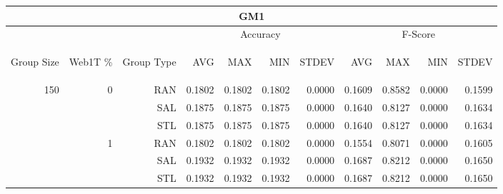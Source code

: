 \begin{center}
\begin{table}[htbp] 
 \begin{center}
\begin{tabular}{ | r | r | r | r | r | r | r | r | r | r | r |}
\hline
\multicolumn{11}{|c|}{GM1}\\
\hline
 & & & \multicolumn{4}{|c|}{Accuracy} & \multicolumn{4}{|c|}{F-Score}\\ \cline{4-11}
\begin{sideways}Group Size\end{sideways} & \begin{sideways}Web1T \%\end{sideways} & \begin{sideways}Group Type\end{sideways} & \begin{sideways}AVG\end{sideways} & \begin{sideways}MAX\end{sideways} & \begin{sideways}MIN\end{sideways} & \begin{sideways}STDEV\end{sideways} & \begin{sideways}AVG\end{sideways} & \begin{sideways}MAX\end{sideways} & \begin{sideways}MIN\end{sideways} & \begin{sideways}STDEV\end{sideways}\\
\hline
\multirow{18}{*}{150}
 & \multirow{3}{*}{0} & RAN & 0.1802 & 0.1802 & 0.1802 & 0.0000 & 0.1609 & 0.8582 & 0.0000 & 0.1599\\ \cline{3-11}
 &   & SAL & 0.1875 & 0.1875 & 0.1875 & 0.0000 & 0.1640 & 0.8127 & 0.0000 & 0.1634\\ \cline{3-11}
 &   & STL & 0.1875 & 0.1875 & 0.1875 & 0.0000 & 0.1640 & 0.8127 & 0.0000 & 0.1634\\ \cline{2-11}
 & \multirow{3}{*}{1} & RAN & 0.1802 & 0.1802 & 0.1802 & 0.0000 & 0.1554 & 0.8071 & 0.0000 & 0.1605\\ \cline{3-11}
 &   & SAL & 0.1932 & 0.1932 & 0.1932 & 0.0000 & 0.1687 & 0.8212 & 0.0000 & 0.1650\\ \cline{3-11}
 &   & STL & 0.1932 & 0.1932 & 0.1932 & 0.0000 & 0.1687 & 0.8212 & 0.0000 & 0.1650\\ \cline{2-11}

\end{tabular}
\end{center}
\end{table}
\end{center}
